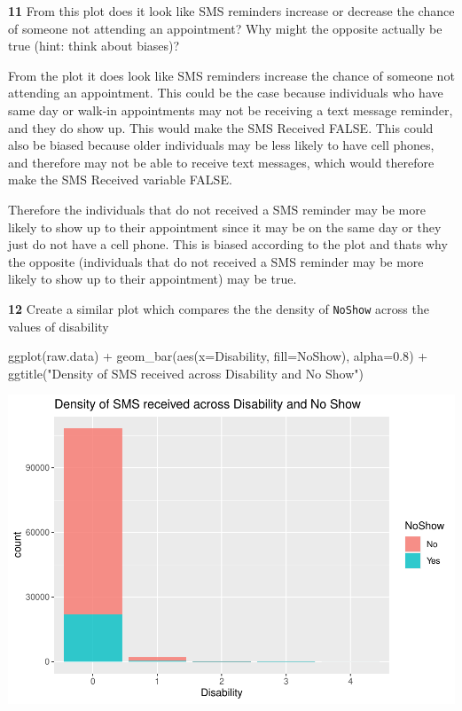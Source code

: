 \documentclass[
]{article}
\newenvironment{Shaded}{\begin{snugshade}}{\end{snugshade}}
\newcommand{\AttributeTok}[1]{\textcolor[rgb]{0.77,0.63,0.00}{#1}}
\newcommand{\FloatTok}[1]{\textcolor[rgb]{0.00,0.00,0.81}{#1}}
\newcommand{\FunctionTok}[1]{\textcolor[rgb]{0.00,0.00,0.00}{#1}}
\newcommand{\NormalTok}[1]{#1}
\newcommand{\SpecialCharTok}[1]{\textcolor[rgb]{0.00,0.00,0.00}{#1}}
\newcommand{\StringTok}[1]{\textcolor[rgb]{0.31,0.60,0.02}{#1}}
\begin{document}
\textbf{11} From this plot does it look like SMS reminders increase or
decrease the chance of someone not attending an appointment? Why might
the opposite actually be true (hint: think about biases)?

From the plot it does look like SMS reminders increase the chance of
someone not attending an appointment. This could be the case because
individuals who have same day or walk-in appointments may not be
receiving a text message reminder, and they do show up. This would make
the SMS Received FALSE. This could also be biased because older
individuals may be less likely to have cell phones, and therefore may
not be able to receive text messages, which would therefore make the SMS
Received variable FALSE.

Therefore the individuals that do not received a SMS reminder may be
more likely to show up to their appointment since it may be on the same
day or they just do not have a cell phone. This is biased according to
the plot and thats why the opposite (individuals that do not received a
SMS reminder may be more likely to show up to their appointment) may be
true.

\textbf{12} Create a similar plot which compares the the density of
\texttt{NoShow} across the values of disability

\begin{Shaded}
\begin{Highlighting}[]
\FunctionTok{ggplot}\NormalTok{(raw.data) }\SpecialCharTok{+} 
  \FunctionTok{geom\_bar}\NormalTok{(}\FunctionTok{aes}\NormalTok{(}\AttributeTok{x=}\NormalTok{Disability, }\AttributeTok{fill=}\NormalTok{NoShow), }\AttributeTok{alpha=}\FloatTok{0.8}\NormalTok{) }\SpecialCharTok{+} 
  \FunctionTok{ggtitle}\NormalTok{(}\StringTok{"Density of SMS received across Disability and No Show"}\NormalTok{)}
\end{Highlighting}
\end{Shaded}

\begin{center}\includegraphics{lab1_medical_databases_files/figure-latex/unnamed-chunk-10-1} \end{center}
\end{document}
